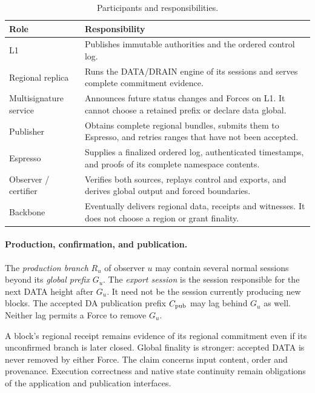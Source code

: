 \documentclass[11pt,a4paper]{article}
\newcommand{\defterm}[1]{\textcolor{rrBlue}{\textit{#1}}}
\begin{document}
\begin{table}[htbp]\centering\small
\caption{Participants and responsibilities.}\label{tab:roles}
\begin{tabularx}{\linewidth}{@{}>{\raggedright\arraybackslash}p{.19\linewidth}Y@{}}\toprule
Role & Responsibility\\\midrule
L1 & Publishes immutable authorities and the ordered control log.\\
Regional replica & Runs the DATA/DRAIN engine of its sessions and
serves complete commitment evidence.\\
Multisignature service & Announces future status changes and Forces
on L1. It cannot choose a retained prefix or declare data global.\\
Publisher & Obtains complete regional bundles, submits them to
Espresso, and retries ranges that have not been accepted.\\
Espresso & Supplies a finalized ordered log, authenticated timestamps,
and proofs of its complete namespace contents.\\
Observer / certifier & Verifies both sources, replays control and
exports, and derives global output and forced boundaries.\\
Backbone & Eventually delivers regional data, receipts and witnesses.
It does not choose a region or grant finality.\\\bottomrule
\end{tabularx}
\end{table}

\paragraph{Production, confirmation, and publication.}
The \defterm{production branch} $R_u$ of observer $u$ may contain
several normal sessions beyond its \defterm{global prefix} $G_u$.
The \defterm{export session} is the session responsible for the next
DATA height after $G_u$. It need not be the session currently producing
new blocks. The accepted DA publication prefix $C_{\rm pub}$ may lag
behind $G_u$ as well. Neither lag permits a Force to remove $G_u$.

A block's regional receipt remains evidence of its regional commitment
even if its unconfirmed branch is later closed. Global finality is
stronger: accepted DATA is never removed by either Force.
The claim concerns input content, order and provenance. Execution
correctness and native state continuity remain obligations of the
application and publication interfaces.
\end{document}
